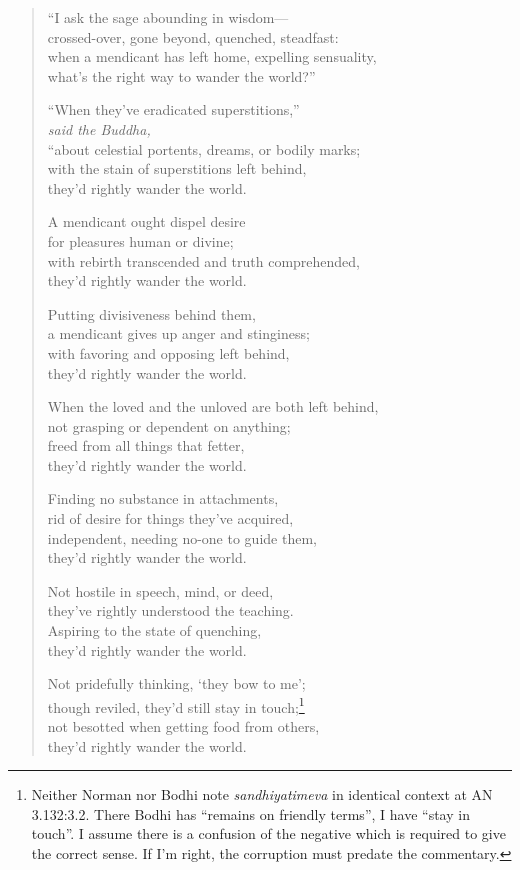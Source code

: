 \documentclass[12pt,openany]{book}%
\newcommand*{\scspeaker}[1]{\hspace{2em}\textit{#1}}
\begin{document}
\begin{verse}%
“I ask the sage abounding in wisdom—\\
crossed-over, gone beyond, quenched, steadfast: \\
when a mendicant has left home, expelling sensuality, \\
what’s the right way to wander the world?” 

“When they’ve eradicated superstitions,” \\
\scspeaker{said the Buddha, }\\
“about celestial portents, dreams, or bodily marks; \\
with the stain of superstitions left behind, \\
they’d rightly wander the world. 

A mendicant ought dispel desire \\
for pleasures human or divine; \\
with rebirth transcended and truth comprehended, \\
they’d rightly wander the world. 

Putting divisiveness behind them, \\
a mendicant gives up anger and stinginess; \\
with favoring and opposing left behind, \\
they’d rightly wander the world. 

When the loved and the unloved are both left behind, \\
not grasping or dependent on anything; \\
freed from all things that fetter, \\
they’d rightly wander the world. 

Finding no substance in attachments, \\
rid of desire for things they’ve acquired, \\
independent, needing no-one to guide them, \\
they’d rightly wander the world. 

Not hostile in speech, mind, or deed, \\
they’ve rightly understood the teaching. \\
Aspiring to the state of quenching, \\
they’d rightly wander the world. 

Not pridefully thinking, ‘they bow to me’; \\
though reviled, they’d still stay in touch;\footnote{Neither Norman nor Bodhi note \textit{sandhiyatimeva} in identical context at AN 3.132:3.2. There Bodhi has “remains on friendly terms”, I have “stay in touch”. I assume there is a confusion of the negative which is required to give the correct sense. If I’m right, the corruption must predate the commentary. } \\
not besotted when getting food from others, \\
they’d rightly wander the world. 


\end{verse}
\end{document}
